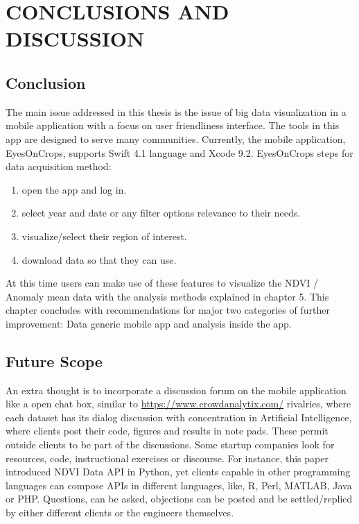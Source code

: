 \chapter{CONCLUSIONS AND DISCUSSION}
\label{chap:conclusion}

\section{Conclusion}

The main issue addressed in this thesis is the issue of big data visualization in a mobile application with a focus on user friendliness interface. The tools in this app are designed to serve many communities. Currently, the mobile application, EyesOnCrops, supports Swift 4.1 language and Xcode 9.2. EyesOnCrops steps for data acquisition method:
\begin{enumerate}
  \item open the app and log in. 
  \item select year and date or any filter options relevance to their needs.
  \item visualize/select their region of interest.
  \item download data so that they can use.
\end{enumerate}

At this time users can make use of these features to visualize the NDVI / Anomaly mean data with the analysis methods explained in chapter 5. 
This chapter concludes with recommendations for major two
categories of further improvement: Data generic mobile app and analysis inside the app.

\section{Future Scope}

An extra thought is to incorporate a discussion forum on the mobile application like a open chat box, similar to \url{https://www.crowdanalytix.com/} rivalries, where each dataset has its dialog discussion with concentration in Artificial Intelligence, where clients post their code, figures and results in note pads. These permit outside clients to be part of the discussions. Some startup companies look for resources, code, instructional exercises or discourse. For instance, this paper introduced NDVI Data API in Python, yet clients capable in other programming languages can compose APIs in different languages, like, R, Perl, MATLAB, Java or PHP. Questions, can be asked, objections can be posted and be settled/replied by either different clients or the engineers themselves. \\

